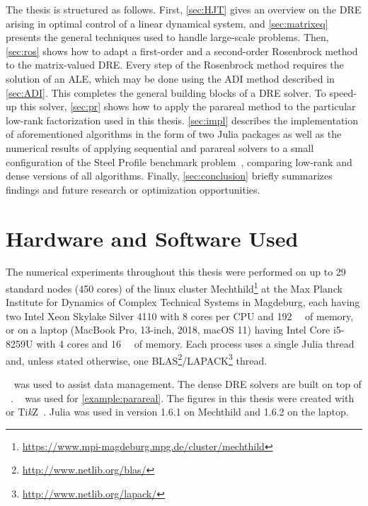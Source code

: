The thesis is structured as follows.
First, \autoref{sec:HJT} gives an overview on the \ac{DRE} arising in optimal control of a linear dynamical system,
and \autoref{sec:matrixeq} presents the general techniques used to handle large-scale problems.
Then, \autoref{sec:ros} shows how to adapt a first-order and a second-order Rosenbrock method to the matrix-valued \ac{DRE}.
Every step of the Rosenbrock method requires the solution of an \ac{ALE},
which may be done using \eg the \ac{ADI} method described in \autoref{sec:ADI}.
This completes the general building blocks of a \ac{DRE} solver.
To speed-up this solver,
\autoref{sec:pr} shows how to apply the parareal method to the particular low-rank factorization used in this thesis.
\autoref{sec:impl} describes the implementation of aforementioned algorithms in the form of two Julia packages
as well as the numerical results of applying sequential and parareal solvers to
a small configuration of the Steel Profile benchmark problem~\cite{morwiki_steel},
comparing low-rank and dense versions of all algorithms.
Finally, \autoref{sec:conclusion} briefly summarizes findings and future research or optimization opportunities.

\section*{Hardware and Software Used}

The numerical experiments throughout this thesis were performed
on up to 29 standard nodes (450 cores) of the linux cluster Mechthild\footnote{\url{https://www.mpi-magdeburg.mpg.de/cluster/mechthild}}
at the Max Planck Institute for Dynamics of Complex Technical Systems in Magdeburg,
each having
two Intel Xeon Skylake Silver 4110 with 8 cores per CPU
and \SI{192}{\giga\byte} of memory,
or on a laptop (MacBook Pro, 13-inch, 2018, macOS 11) having
Intel Core i5-8259U with 4 cores and \SI{16}{\giga\byte} of memory.
Each process uses a single Julia thread and,
unless stated otherwise, one BLAS\footnote{%
  \url{http://www.netlib.org/blas/}
}/LAPACK\footnote{%
  \url{http://www.netlib.org/lapack/}
} thread.

~\cite{DrWatson} was used to assist data management.
The dense \ac{DRE} solvers are built on top of ~\cite{MatrixEquations}.
~\cite{DifferentialEquations} was used for \autoref{example:parareal}.
The figures in this thesis were created with
~\cite{Makie} or Ti\emph{k}Z~\cite{TikZ}.
Julia was used in version 1.6.1 on Mechthild and 1.6.2 on the laptop.


